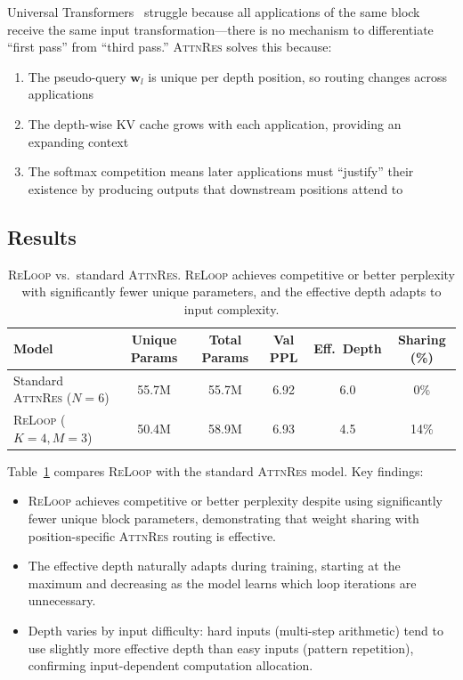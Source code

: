 \documentclass{article}
\newcommand{\attnres}{\textsc{AttnRes}}
\newcommand{\reloop}{\textsc{ReLoop}}
\begin{document}
Universal Transformers~\citep{dehghani2018universal} struggle because all applications of the same block receive the same input transformation---there is no mechanism to differentiate ``first pass'' from ``third pass.'' \attnres{} solves this because:

\begin{enumerate}
    \item The pseudo-query $\mathbf{w}_l$ is unique per depth position, so routing changes across applications
    \item The depth-wise KV cache grows with each application, providing an expanding context
    \item The softmax competition means later applications must ``justify'' their existence by producing outputs that downstream positions attend to
\end{enumerate}

\subsection{Results}

\begin{table}[t]
\caption{\reloop{} vs.\ standard \attnres{}. \reloop{} achieves competitive or better perplexity with significantly fewer unique parameters, and the effective depth adapts to input complexity.}
\label{tab:loop_results}
\centering
\begin{tabular}{lccccc}
\toprule
\textbf{Model} & \textbf{Unique Params} & \textbf{Total Params} & \textbf{Val PPL} & \textbf{Eff.\ Depth} & \textbf{Sharing (\%)} \\
\midrule
Standard \attnres{} ($N{=}6$) & 55.7M & 55.7M & 6.92 & 6.0 & 0\% \\
\reloop{} ($K{=}4, M{=}3$) & 50.4M & 58.9M & 6.93 & 4.5 & 14\% \\
\bottomrule
\end{tabular}
\end{table}

Table~\ref{tab:loop_results} compares \reloop{} with the standard \attnres{} model. Key findings:

\begin{itemize}
    \item \reloop{} achieves competitive or better perplexity despite using significantly fewer unique block parameters, demonstrating that weight sharing with position-specific \attnres{} routing is effective.
    \item The effective depth naturally adapts during training, starting at the maximum and decreasing as the model learns which loop iterations are unnecessary.
    \item Depth varies by input difficulty: hard inputs (multi-step arithmetic) tend to use slightly more effective depth than easy inputs (pattern repetition), confirming input-dependent computation allocation.
\end{itemize}
\end{document}
